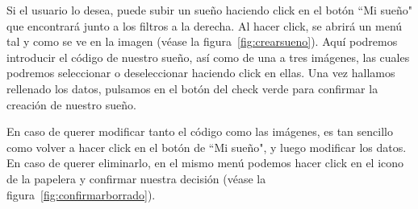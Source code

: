 \clearpage

Si el usuario lo desea, puede subir un sueño haciendo click en el botón ``Mi sueño" que encontrará junto a los filtros a la derecha. Al hacer click, se abrirá un menú tal y como se ve en la imagen {(v\'ease la figura~\ref{fig:crearsueno})}. Aquí podremos introducir el código de nuestro sueño, así como de una a tres imágenes, las cuales podremos seleccionar o deseleccionar haciendo click en ellas. Una vez hallamos rellenado los datos, pulsamos en el botón del check verde para confirmar la creación de nuestro sueño.\\


En caso de querer modificar tanto el código como las imágenes, es tan sencillo como volver a hacer click en el botón de ``Mi sueño", y luego modificar los datos. En caso de querer eliminarlo, en el mismo menú podemos hacer click en el icono de la papelera y confirmar nuestra decisión {(v\'ease la figura~\ref{fig:confirmarborrado})}.\\

